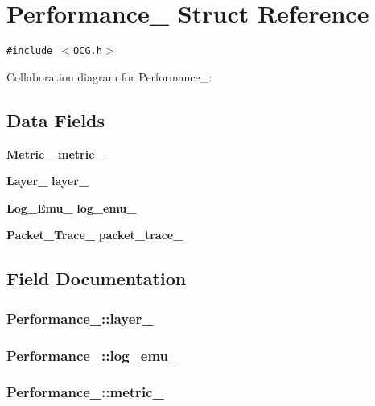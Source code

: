 \section{Performance\_\- Struct Reference}
\label{structPerformance__}
{\tt \#include $<$OCG.h$>$}

Collaboration diagram for Performance\_\-:\subsection*{Data Fields}
\begin{CompactItemize}
\item 
{\bf Metric\_\-} {\bf metric\_\-}
\item 
{\bf Layer\_\-} {\bf layer\_\-}
\item 
{\bf Log\_\-Emu\_\-} {\bf log\_\-emu\_\-}
\item 
{\bf Packet\_\-Trace\_\-} {\bf packet\_\-trace\_\-}
\end{CompactItemize}


\subsection{Field Documentation}
\subsubsection[{layer\_\-}]{ {\bf Performance\_\-::layer\_\-}}\label{structPerformance___df3618c25f512205cd2c6fb9eae1f954}


\subsubsection[{log\_\-emu\_\-}]{ {\bf Performance\_\-::log\_\-emu\_\-}}\label{structPerformance___1ebf7853d52a0e741caaa0af552dfdc8}


\subsubsection[{metric\_\-}]{ {\bf Performance\_\-::metric\_\-}}\label{structPerformance___df40126943d6f9fc46e114b8c45b6512}


